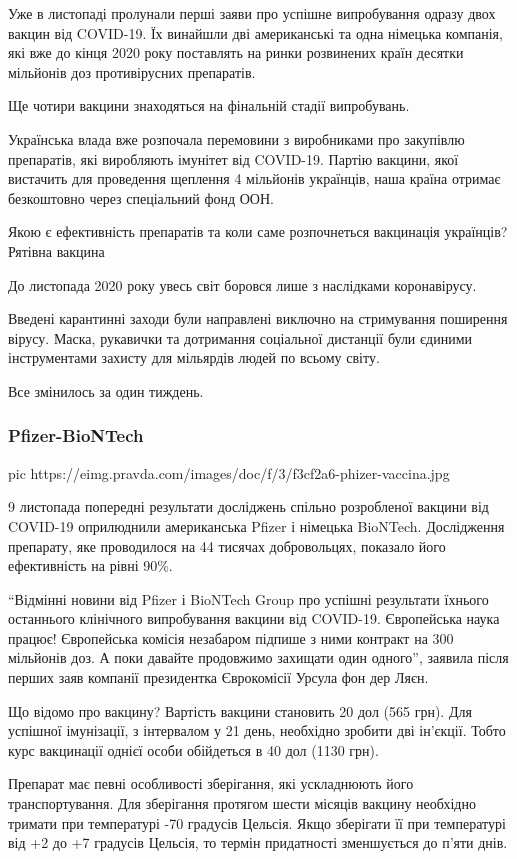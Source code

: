 Уже в листопаді пролунали перші заяви про успішне випробування одразу двох
вакцин від COVID-19. Їх винайшли дві американські та одна німецька компанія,
які вже до кінця 2020 року поставлять на ринки розвинених країн десятки
мільйонів доз противірусних препаратів.

Ще чотири вакцини знаходяться на фінальній стадії випробувань.

Українська влада вже розпочала перемовини з виробниками про закупівлю
препаратів, які виробляють імунітет від COVID-19. Партію вакцини, якої
вистачить для проведення щеплення 4 мільйонів українців, наша країна отримає
безкоштовно через спеціальний фонд ООН.

Якою є ефективність препаратів та коли саме розпочнеться вакцинація українців?
Рятівна вакцина

До листопада 2020 року увесь світ боровся лише з наслідками коронавірусу.

Введені карантинні заходи були направлені виключно на стримування поширення
вірусу. Маска, рукавички та дотримання соціальної дистанції були єдиними
інструментами захисту для мільярдів людей по всьому світу.

Все змінилось за один тиждень.

\subsubsection{Pfizer-BioNTech}

\ifcmt
pic https://eimg.pravda.com/images/doc/f/3/f3cf2a6-phizer-vaccina.jpg
\fi

9 листопада попередні результати досліджень спільно розробленої вакцини від
COVID-19 оприлюднили американська Pfizer і німецька BioNTech. Дослідження
препарату, яке проводилося на 44 тисячах добровольцях, показало його
ефективність на рівні 90\%.

\enquote{Відмінні новини від Pfizer і BioNTech Group про успішні результати їхнього
останнього клінічного випробування вакцини від COVID-19. Європейська наука
працює! Європейська комісія незабаром підпише з ними контракт на 300 мільйонів
доз. А поки давайте продовжимо захищати один одного}, \dshM заявила після перших
заяв компанії президентка Єврокомісії Урсула фон дер Ляєн.

Що відомо про вакцину? Вартість вакцини становить 20 дол (565 грн). Для
успішної імунізації, з інтервалом у 21 день, необхідно зробити дві
ін’єкції. Тобто курс вакцинації однієї особи обійдеться в 40 дол (1130
грн).

Препарат має певні особливості зберігання, які ускладнюють його
транспортування. Для зберігання протягом шести місяців вакцину необхідно
тримати при температурі -70 градусів Цельсія. Якщо зберігати її при
температурі від +2 до +7 градусів Цельсія, то термін придатності
зменшується до п'яти днів.

